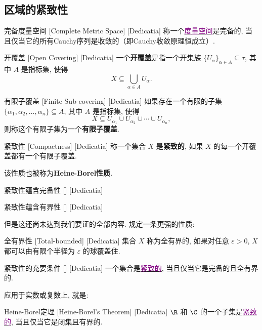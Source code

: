 \documentclass[UTF8]{ctexart}
\newcommand{\hyperrefc}[2]{\hyperref[#1]{\textcolor{purple}{#2}}}
\begin{document}
\subsection{区域的紧致性}
\begin{dfn}
    [UUID]
    {完备度量空间}
    [Complete Metric Space]
    [Dedicatia]
    称一个\hyperrefc{dfn:MetricSpace}{度量空间}是完备的, 当且仅当它的所有Cauchy序列是收敛的（即Cauchy收敛原理恒成立）. 
\end{dfn}
\begin{dfn}
    [UUID]
    {开覆盖}
    [Open Covering]
    [Dedicatia]
    一个\textbf{开覆盖}是指一个开集族 \( \{U_\alpha\}_{\alpha \in A} \subseteq \tau \), 其中 \( A \) 是指标集, 使得
    \[X \subseteq \bigcup_{\alpha \in A} U_\alpha.\]
\end{dfn}
\begin{dfn}
    [UUID]
    {有限子覆盖}
    [Finite Sub-covering]
    [Dedicatia]
    如果存在一个有限的子集 \( \{\alpha_1, \alpha_2, \ldots, \alpha_n\} \subseteq A \), 其中 \( A \) 是指标集, 使得
    \[X \subseteq U_{\alpha_1} \cup U_{\alpha_2} \cup \cdots \cup U_{\alpha_n},\]
    则称这个有限子集为一个\textbf{有限子覆盖}. 
\end{dfn}
\begin{dfn}
    [Compactness]
    {紧致性}
    [Compactness]
    [Dedicatia]
    称一个集合 \( X \) 是\textbf{紧致的}, 如果 \(X\) 的每一个开覆盖都有一个有限子覆盖.
\end{dfn}
该性质也被称为\textbf{Heine-Borel性质}. 
\begin{thm}
    [UUID]
    {紧致性蕴含完备性}
    []
    [Dedicatia]
\end{thm}
\begin{thm}
    [UUID]
    {紧致性蕴含有界性}
    []
    [Dedicatia]
\end{thm}
但是这还尚未达到我们要证的全部内容. 规定一条更强的性质: 
\begin{dfn}
    [UUID]
    {全有界性}
    [Total-bounded]
    [Dedicatia]
    集合 \( X \) 称为全有界的, 如果对任意 \( \varepsilon>0 \),  \( X \) 都可以由有限个半径为 \( \varepsilon \) 的球覆盖住. 
\end{dfn}
\begin{thm}
    [UUID]
    {紧致性的充要条件}
    []
    [Dedicatia]
    一个集合是\hyperrefc{dfn:Compactness}{紧致的}, 当且仅当它是完备的且全有界的. 
\end{thm}
应用于实数或复数上, 就是:
\begin{xmp}
    [UUID]
    {Heine-Borel定理}
    [Heine-Borel's Theorem]
    [Dedicatia]
     \( \R \) 和 \( \C \) 的一个子集是\hyperrefc{dfn:Compactness}{紧致的}, 当且仅当它是闭集且有界的. 
\end{xmp}
\end{document}
